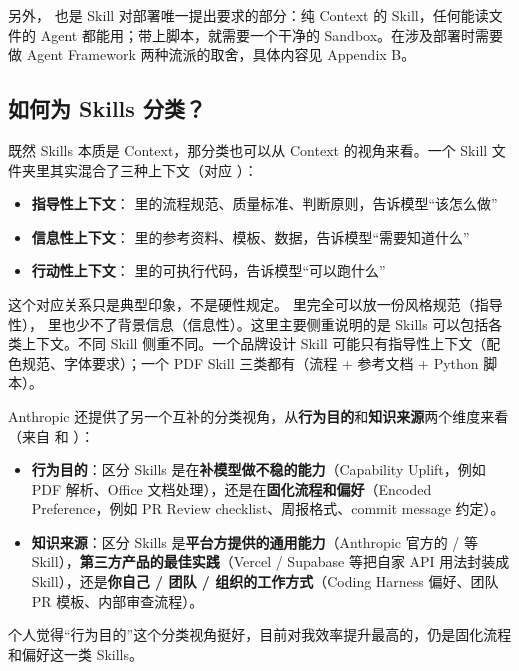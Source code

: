 另外， 也是 Skill 对部署唯一提出要求的部分：纯 Context 的 Skill，任何能读文件的 Agent 都能用；带上脚本，就需要一个干净的 Sandbox。在涉及部署时需要做 Agent Framework 两种流派的取舍，具体内容见 Appendix B。

\subsection{如何为 Skills 分类？}

既然 Skills 本质是 Context，那分类也可以从 Context 的视角来看。一个 Skill 文件夹里其实混合了三种上下文（对应 ）：

\begin{itemize}
  \item \textbf{指导性上下文}： 里的流程规范、质量标准、判断原则，告诉模型“该怎么做”
  \item \textbf{信息性上下文}： 里的参考资料、模板、数据，告诉模型“需要知道什么”
  \item \textbf{行动性上下文}： 里的可执行代码，告诉模型“可以跑什么”
\end{itemize}

这个对应关系只是典型印象，不是硬性规定。 里完全可以放一份风格规范（指导性）， 里也少不了背景信息（信息性）。这里主要侧重说明的是 Skills 可以包括各类上下文。不同 Skill 侧重不同。一个品牌设计 Skill 可能只有指导性上下文（配色规范、字体要求）；一个 PDF Skill 三类都有（流程 + 参考文档 + Python 脚本）。

Anthropic 还提供了另一个互补的分类视角，从\textbf{行为目的}和\textbf{知识来源}两个维度来看（来自  和 ）：

\begin{itemize}
  \item \textbf{行为目的}：区分 Skills 是在\textbf{补模型做不稳的能力}（Capability Uplift，例如 PDF 解析、Office 文档处理），还是在\textbf{固化流程和偏好}（Encoded Preference，例如 PR Review checklist、周报格式、commit message 约定）。
  \item \textbf{知识来源}：区分 Skills 是\textbf{平台方提供的通用能力}（Anthropic 官方的  /  等 Skill），\textbf{第三方产品的最佳实践}（Vercel / Supabase 等把自家 API 用法封装成 Skill），还是\textbf{你自己 / 团队 / 组织的工作方式}（Coding Harness 偏好、团队 PR 模板、内部审查流程）。
\end{itemize}

个人觉得“行为目的”这个分类视角挺好，目前对我效率提升最高的，仍是固化流程和偏好这一类 Skills。

